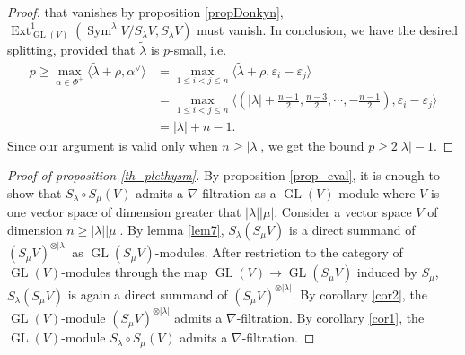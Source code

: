 \documentclass[11pt]{amsart}
\numberwithin{subsection}{section}
\numberwithin{figure}{section}
\numberwithin{table}{section}
\theoremstyle{1}
\theoremstyle{2}
\DeclareMathOperator{\Ext}{Ext}
\DeclareMathOperator{\GL}{GL}
\DeclareMathOperator{\Sym}{Sym}
\begin{document}
\begin{proof}
that vanishes by proposition \ref{propDonkyn}, $\Ext^1_{\GL(V)}(\Sym^{\lambda} V/S_{\lambda}V,S_{\lambda}V)$ must vanish. In conclusion, we have the desired splitting, provided that $\tilde{\lambda}$ is $p$-small, i.e. 
\begin{equation*}
\begin{aligned}
p \geq \max_{\alpha \in \Phi^+} \langle \tilde{\lambda} + \rho, \alpha^{\vee} \rangle &=  \max_{ 1 \leq i < j \leq n} \langle \tilde{\lambda} + \rho, \varepsilon_i -\varepsilon_j \rangle \\
&=  \max_{ 1 \leq i < j \leq n} \langle (|\lambda |+\frac{n-1}{2}, \frac{n-3}{2}, \cdots, -\frac{n-1}{2} ), \varepsilon_i -\varepsilon_j \rangle \\
&= |\lambda |+n-1.
\end{aligned}
\end{equation*}
Since our argument is valid only when $n \geq |\lambda |$, we get the bound $p \geq 2| \lambda |-1$.
\end{proof}
\begin{proof}[Proof of proposition \ref{th_plethysm}]
By proposition \ref{prop_eval}, it is enough to show that $S_{\lambda}\circ S_{\mu} (V)$ admits a $\nabla$-filtration as a $\GL(V)$-module where $V$ is one vector space of dimension greater that $|\lambda ||\mu |$. Consider a vector space $V$ of dimension $n\geq |\lambda ||\mu |$. By lemma \ref{lem7}, $S_{\lambda}(S_{\mu}V)$ is a direct summand of $(S_{\mu}V)^{\otimes |\lambda |}$ as $\GL(S_{\mu}V)$-modules. After restriction to the category of $\GL(V)$-modules through the map $\GL(V) \rightarrow \GL(S_{\mu}V)$ induced by $S_{\mu}$, $S_{\lambda}(S_{\mu}V)$ is again a direct summand of $(S_{\mu}V)^{\otimes |\lambda |}$. By corollary \ref{cor2}, the $\GL(V)$-module $(S_{\mu}V)^{\otimes |\lambda |}$ admits a $\nabla$-filtration. By corollary \ref{cor1}, the $\GL(V)$-module $S_{\lambda}\circ S_{\mu} (V)$ admits a $\nabla$-filtration.
\end{proof}
\end{document}
